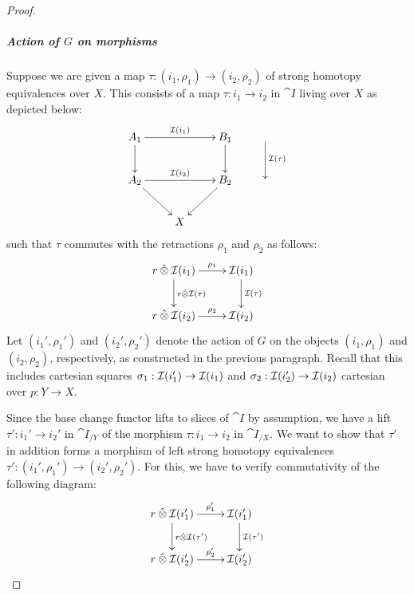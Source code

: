 \documentclass[reqno,10pt,a4paper,oneside]{amsart}
\begin{document}
\begin{proof}
\hfill

\subparagraph{\textbf{Action of $G$ on morphisms}}

Suppose we are given a map $\tau : (i_1, \rho_1) \to (i_2, \rho_2)$ of strong homotopy equivalences over $X$.
This consists of a map $\tau : i_1 \to i_2$ in $\cat{I}$ living over $X$ as depicted below:
\[
\xymatrix{
  A_1
  \ar[rr]^{\cal{I}(i_1)}
  \ar[d]
&&
  B_1
  \ar[d]
&
  \ar[d]^{\cal{I}(\tau)}
\\
  A_2
  \ar[rr]^{\cal{I}(i_2)}
  \ar[dr]
&&
  B_2
  \ar[dl]
&
\\&
  X
}
\]
such that $\tau$ commutes with the retractions $\rho_1$ and $\rho_2$ as follows:
\[
\xymatrix{
  \intervalr \hatotimes \cal{I}(i_1)
  \ar[r]^-{\rho_1}
  \ar[d]^{\intervalr \hatotimes \cal{I}(\tau)}
&
  \cal{I}(i_1)
  \ar[d]^{\cal{I}(\tau)}
\\
  \intervalr \hatotimes \cal{I}(i_2)
  \ar[r]^-{\rho_2}
&
  \cal{I}(i_2)
}
\]
Let $(i_1', \rho_1')$ and $(i_2', \rho_2')$ denote the action of $G$ on the objects $(i_1, \rho_1)$ and $(i_2, \rho_2)$, respectively, as constructed in the previous paragraph.
Recall that this includes cartesian squares $\sigma_1 : \cal{I}(i_1') \to \cal{I}(i_1)$ and $\sigma_2 : \cal{I}(i_2') \to \cal{I}(i_2)$ cartesian over $p : Y \to X$.

Since the base change functor lifts to slices of $\cat{I}$ by assumption, we have a lift $\tau' : i_1' \to i_2'$ in $\cat{I}_{/Y}$ of the morphism $\tau : i_1 \to i_2$ in $\cat{I}_{/X}$.
We want to show that $\tau'$ in addition forms a morphism of left strong homotopy equivalences $\tau' : (i_1', \rho_1') \to (i_2', \rho_2')$.
For this, we have to verify commutativity of the following diagram:
\[
\xymatrix{
  \intervalr \hatotimes \cal{I}(i_1')
  \ar[r]^-{\rho_1'}
  \ar[d]^{\intervalr \hatotimes \cal{I}(\tau')}
&
  \cal{I}(i_1')
  \ar[d]^{\cal{I}(\tau')}
\\
  \intervalr \hatotimes \cal{I}(i_2')
  \ar[r]^-{\rho_2'}
&
  \cal{I}(i_2')
}
\]


\end{proof}
\end{document}
